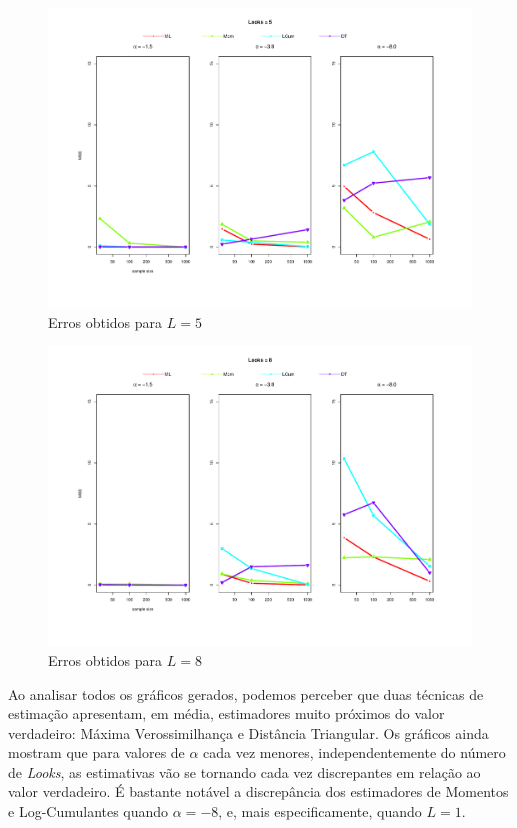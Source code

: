\begin{figure}[H]
     \centering
     \includegraphics[scale=0.5]{plots/mse_L=5.pdf}
     \caption{Erros obtidos para $L=5$}
     \label{graf_14}
\end{figure}
\begin{figure}[H]
     \centering
     \includegraphics[scale=0.5]{plots/mse_L=8.pdf}
     \caption{Erros obtidos para $L=8$}
     \label{graf_15}
\end{figure}

Ao analisar todos os gráficos gerados, podemos perceber que duas técnicas de estimação apresentam, em média, estimadores muito próximos do valor verdadeiro: Máxima Verossimilhança e Distância Triangular. Os gráficos ainda mostram que para valores de $\alpha$ cada vez menores, independentemente do número de \textit{Looks}, as estimativas vão se tornando cada vez discrepantes em relação ao valor verdadeiro. É bastante notável a discrepância dos estimadores de Momentos e Log-Cumulantes quando $\alpha = -8$, e, mais especificamente, quando $L = 1$. 

